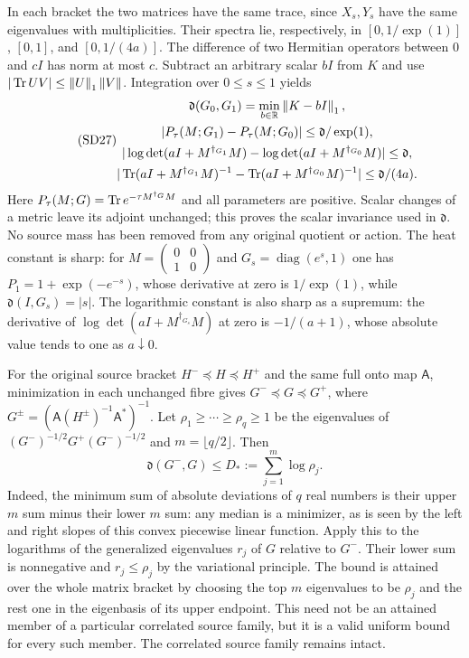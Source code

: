 In each bracket the two matrices have the same trace, since $X_s,Y_s$
have the same eigenvalues with multiplicities. Their spectra lie,
respectively, in $[0,1/\exp(1)]$, $[0,1]$, and $[0,1/(4a)]$.
The difference of two Hermitian operators between $0$ and $cI$ has
norm at most $c$. Subtract an arbitrary scalar $bI$ from $K$ and use
$|\operatorname{Tr} UV|\le\left\lVert U\right\rVert_1\left\lVert V\right\rVert$. Integration over $0\le s\le1$ yields
\begin{equation}\tag{SD27}
\begin{gathered}
\mathfrak d(G_0,G_1)=\min_{b\in\mathbb R}\left\lVert K-bI\right\rVert_1,\\
|P_\tau(M;G_1)-P_\tau(M;G_0)|\le\mathfrak d/\exp(1),\\
|\log\det(aI+M^{\dagger_{G_1}}M)
-\log\det(aI+M^{\dagger_{G_0}}M)|\le\mathfrak d,\\
|\operatorname{Tr}(aI+M^{\dagger_{G_1}}M)^{-1}
-\operatorname{Tr}(aI+M^{\dagger_{G_0}}M)^{-1}|\le\mathfrak d/(4a).
\end{gathered}
\end{equation}
Here $P_\tau(M;G)=\operatorname{Tr} e^{-\tau M^{\dagger_G}M}$ and all parameters
are positive. Scalar changes of a metric leave its adjoint unchanged;
this proves the scalar invariance used in $\mathfrak d$. No source
mass has been removed from any original quotient or action.
The heat constant is sharp: for
$M=\left(\begin{smallmatrix}0&0\\1&0\end{smallmatrix}\right)$ and
$G_s=\operatorname{diag}(e^s,1)$ one has
$P_1=1+\exp(-e^{-s})$, whose derivative at zero is $1/\exp(1)$,
while $\mathfrak d(I,G_s)=|s|$.
The logarithmic constant is also sharp as a supremum: the derivative
of $\log\det(aI+M^{\dagger_{G_s}}M)$ at zero is $-1/(a+1)$,
whose absolute value tends to one as $a\downarrow0$.

For the original source bracket $H^-\preceq H\preceq H^+$ and the
same full onto map $\mathsf A$, minimization in each unchanged fibre
gives $G^-\preceq G\preceq G^+$, where
$G^\pm=(\mathsf A(H^\pm)^{-1}\mathsf A^*)^{-1}$. Let
$\rho_1\ge\cdots\ge\rho_q\ge1$ be the eigenvalues of
$(G^-)^{-1/2}G^+(G^-)^{-1/2}$ and $m=\lfloor q/2\rfloor$. Then
\begin{equation}\tag{SD28}
\boxed{\mathfrak d(G^-,G)\le D_*:=\sum_{j=1}^m\log\rho_j.}
\end{equation}
Indeed, the minimum sum of absolute deviations of $q$ real numbers
is their upper $m$ sum minus their lower $m$ sum: any median is a
minimizer, as is seen by the left and right slopes of this convex
piecewise linear function. Apply this to the logarithms of the
generalized eigenvalues $r_j$ of $G$ relative to $G^-$. Their lower
sum is nonnegative and $r_j\le\rho_j$ by the variational principle.
The bound is attained over the whole matrix bracket by choosing the
top $m$ eigenvalues to be $\rho_j$ and the rest one in the eigenbasis
of its upper endpoint. This need not be an attained member of a
particular correlated source family, but it is a valid uniform bound
for every such member. The correlated source family remains intact.

